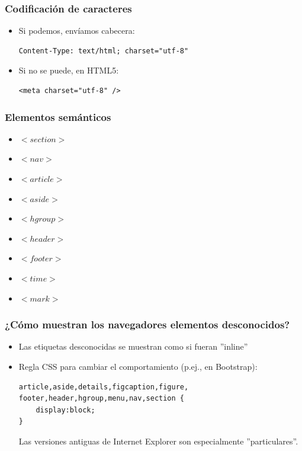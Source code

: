 
\begin{frame}[fragile]
\frametitle{Codificación de caracteres}

\begin{itemize}
  \item Si podemos, envíamos cabecera:
\begin{verbatim}
Content-Type: text/html; charset="utf-8"
\end{verbatim}
  \item Si no se puede, en HTML5:
\begin{verbatim}
<meta charset="utf-8" />
\end{verbatim}

\end{itemize}

\end{frame}


\begin{frame}
\frametitle{Elementos semánticos}

\begin{itemize}
  \item $<section>$
  \item $<nav>$
  \item $<article>$
  \item $<aside>$
  \item $<hgroup>$
  \item $<header>$
  \item $<footer>$
  \item $<time>$
  \item $<mark>$
\end{itemize}

\end{frame}


\begin{frame}[fragile]
\frametitle{¿Cómo muestran los navegadores elementos desconocidos?}

\begin{itemize}
  \item Las etiquetas desconocidas se muestran como si fueran ''inline''
  \item Regla CSS para cambiar el comportamiento (p.ej., en Bootstrap):
\begin{verbatim}
article,aside,details,figcaption,figure,
footer,header,hgroup,menu,nav,section {
    display:block;
}
\end{verbatim}

Las versiones antiguas de Internet Explorer son especialmente ''particulares''.

\end{itemize}

\end{frame}


